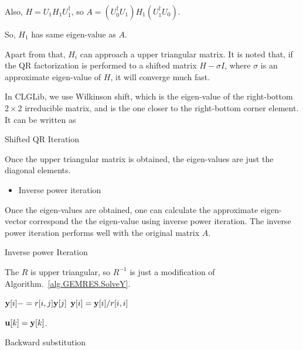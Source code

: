Also, $H=U_1H_1U_1^{\dagger}$, so $A=(U_0^{\dagger}U_1)H_1(U_1^{\dagger}U_0)$.

So, $H_1$ has same eigen-value as $A$.

Apart from that, $H_i$ can approach a upper triangular matrix. It is noted that, if the QR factorization is performed to a shifted matrix $H-\sigma I$, where $\sigma$ is an approximate eigen-value of $H$, it will converge much fast.

In CLGLib, we use Wilkinson shift, which is the eigen-value of the right-bottom $2\times 2$ irreducible matrix, and is the one closer to the right-bottom corner element. It can be written as
\begin{algorithm}[H]
\begin{algorithmic}
    \EndIf
\EndFor

\end{algorithmic}
\caption{Shifted QR Iteration}
\end{algorithm}

Once the upper triangular matrix is obtained, the eigen-values are just the diagonal elements.

\begin{itemize}
  \item {}Inverse power iteration
\end{itemize}

Once the eigen-values are obtained, one can calculate the approximate eigen-vector correspond the the eigen-value using inverse power iteration. The inverse power iteration performs well with the original matrix $A$.
\begin{algorithm}[H]
\begin{algorithmic}
\EndFor

\end{algorithmic}
\caption{Inverse power Iteration}
\end{algorithm}

The $R$ is upper triangular, so $R^{-1}$ is just a modification of Algorithm.~\ref{alg.GEMRES.SolveY}.
\begin{algorithm}[H]
\begin{algorithmic}
        \State ${\bf y}[i]-=r[i,j] {\bf y}[j]$
    \EndFor
    \State ${\bf y}[i] = {\bf y}[i] / r[i,i]$
\EndFor

\Return ${\bf u}[k]={\bf y}[k]$.
\end{algorithmic}
\caption{\label{alg.backsub}Backward substitution}
\end{algorithm}

